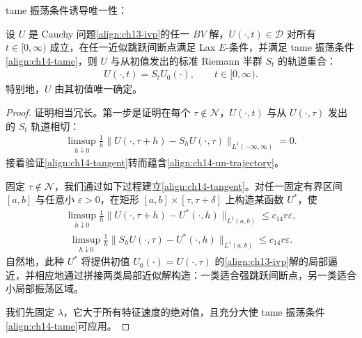 \documentclass[../../main.tex]{subfiles}
\begin{document}
tame 振荡条件诱导唯一性：

\begin{theorem}\label{theorem:ch14-唯一性}
设 $U$ 是 Cauchy 问题\eqref{align:ch13-ivp}的任一 $BV$ 解，$U(\cdot,t)\in\mathscr{D}$ 对所有 $t\in[0,\infty)$ 成立，在任一近似跳跃间断点满足 Lax $E$-条件，并满足 tame 振荡条件\eqref{align:ch14-tame}，则 $U$ 与从初值发出的标准 Riemann 半群 $S_t$ 的轨道重合：
\begin{align}
U(\cdot,t)=S_tU_0(\cdot),\qquad t\in[0,\infty).
\label{align:ch14-un-trajectory}
\end{align}
特别地，$U$ 由其初值唯一确定。
\end{theorem}



\begin{proof}
证明相当冗长。第一步是证明在每个 $\tau\notin\mathscr{N}$，$U(\cdot,t)$ 与从 $U(\cdot,\tau)$ 发出的 $S_t$ 轨道相切：
\begin{align}
\limsup_{h\downarrow0}\frac1h\|U(\cdot,\tau+h)-S_hU(\cdot,\tau)\|_{L^1(-\infty,\infty)}=0.
\label{align:ch14-tangent}
\end{align}
接着验证\eqref{align:ch14-tangent}转而蕴含\eqref{align:ch14-un-trajectory}。

固定 $\tau\notin\mathscr{N}$，我们通过如下过程建立\eqref{align:ch14-tangent}。对任一固定有界区间 $[a,b]$ 与任意小 $\varepsilon>0$，在矩形 $[a,b]\times[\tau,\tau+\delta]$ 上构造某函数 $U^*$，使
\begin{align}
\limsup_{h\downarrow0}\frac1h\|U(\cdot,\tau+h)-U^*(\cdot,h)\|_{L^1(a,b)}\leqslant c_{14}r\varepsilon,
\label{align:ch14-Ustar1}
\end{align}
\begin{align}
\limsup_{h\downarrow0}\frac1h\|S_hU(\cdot,\tau)-U^*(\cdot,h)\|_{L^1(a,b)}\leqslant c_{14}r\varepsilon.
\label{align:ch14-Ustar2}
\end{align}
自然地，此种 $U^*$ 将提供初值 $U_0(\cdot)=U(\cdot,\tau)$ 的\eqref{align:ch13-ivp}解的局部逼近，并相应地通过拼接两类局部近似解构造：一类适合强跳跃间断点，另一类适合小局部振荡区域。



我们先固定 $\lambda$，它大于所有特征速度的绝对值，且充分大使 tame 振荡条件\eqref{align:ch14-tame}可应用。


\end{proof}
\end{document}
